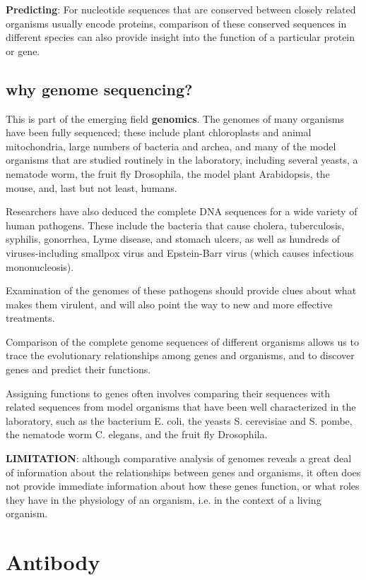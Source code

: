 {\bf Predicting}: For nucleotide sequences that are conserved between closely
related organisms usually encode proteins, comparison of these conserved
sequences in different species can also provide insight into the function of a
particular protein or gene.

\subsection{why genome sequencing?}

This is part of the emerging field {\bf genomics}.
The genomes of many organisms have been fully sequenced; these include plant
chloroplasts and animal mitochondria, large numbers of bacteria and archea, and
many of the model organisms that are studied routinely in the laboratory,
including several yeasts, a nematode worm, the fruit fly Drosophila, the model
plant Arabidopsis, the mouse, and, last but not least, humans.   


Researchers have also deduced the complete DNA sequences for a wide variety of
human pathogens. These include the bacteria that cause cholera, tuberculosis,
syphilis, gonorrhea, Lyme disease, and stomach ulcers, as well as hundreds of
viruses-including smallpox virus and Epstein-Barr virus (which causes infectious
mononucleosis).

Examination of the genomes of these pathogens should provide clues about what
makes them virulent, and will also point the way to new and more effective treatments.

Comparison of the complete genome sequences of different organisms allows us to
trace the evolutionary relationships among genes and organisms, and to discover
genes and predict their functions.

Assigning functions to genes often involves comparing their sequences with
related sequences from model organisms that have been well characterized in the
laboratory, such as the bacterium E. coli, the yeasts S. cerevisiae and S.
pombe, the nematode worm C. elegans, and the fruit fly Drosophila.

{\bf LIMITATION}: although comparative analysis of genomes reveals a great deal
of information about the relationships between genes and organisms, it often
does not provide immediate information about how these genes function, or what
roles they have in the physiology of an organism, i.e. in the context of a
living organism.


\section{Antibody}
\label{sec:antibody}



